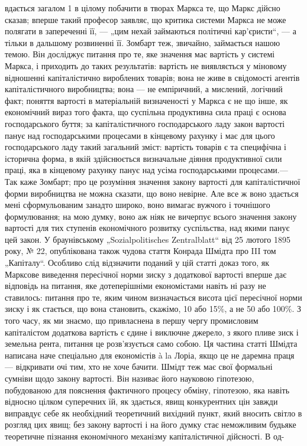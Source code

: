 \parcont{}  %
вдається загалом 1 в цілому побачити в творах Маркса те, що Маркс дійсно сказав; вперше такий професор заявляє, що критика системи Маркса не може полягати в запереченні її, — „цим нехай займаються політичні кар’єристи“, — а тільки в дальшому
розвиненні її. Зомбарт теж, звичайно, займається нашою темою. Він досліджує питання про те, яке значення має вартість у
системі Маркса, і приходить до таких результатів: вартість не виявляється у міновому відношенні капіталістично
вироблених товарів; вона не живе в свідомості агентів капіталістичного виробництва; вона — не емпіричний, а мислений,
логічний факт; поняття вартості в матеріальній визначеності у Маркса є не що інше, як економічний вираз того факта, що
суспільна продуктивна сила праці є основа господарського буття; за капіталістичного господарського ладу закон вартості панує
над господарськими процесами в кінцевому рахунку і має для цього господарського ладу такий загальний зміст: вартість товарів
є та специфічна і історична форма, в якій здійснюється визначальне діяння продуктивної сили праці, яка в кінцевому рахунку
панує над усіма господарськими процесами.— Так каже Зомбарт; про це розуміння значення закону вартості для капіталістичної
форми виробництва не можна сказати, що воно невірне. Але все ж воно здається мені сформульованим занадто широко, воно
вимагає вужчого і точнішого формулювання; на мою думку, воно аж ніяк не вичерпує всього значення закону вартості для тих
ступенів економічного розвитку суспільства, над якими панує цей закон. У браунівському „Sozialpolitisches Zentralblatt“ від
25 лютого 1895 року, № 22, опублікована також чудова стаття Конрада Шмідта про III том „Капіталу“. Особливо слід відзначити
поданий у цій статті доказ того, як Марксове виведення пересічної норми зиску з додаткової вартості вперше дає відповідь на
питання, яке дотеперішніми економістами навіть ні разу не ставилось:  питання про те, яким чином визначається висота цієї
пересічної норми зиску і як стається, що вона становить, скажімо, 10 або 15\%, а не 50 або 100\%. З того часу, як ми
знаємо, що привласнена в першу чергу промисловим капіталістом додаткова вартість є єдине і виключне джерело, з якого пливе
зиск і земельна рента, питання це розв’язується само собою. Ця частина статті Шмідта написана наче спеціально для
економістів à la Лоріа, якщо це не даремна праця — відкривати очі тим, хто не хоче бачити. Шмідт теж має свої формальні
сумніви щодо закону вартості. Він називає його науковою гіпотезою, побудованою для пояснення фактичного процесу обміну,
гіпотезою, яка навіть відносно цілком суперечних їй, як здається, явищ конкурентних цін завжди виправдує себе як необхідний
теоретичний вихідний пункт, який вносить світло в розгляд цих явищ; без закону вартості і на його думку стає неможливим
будьяке теоретичне пізнання економічного механізму капіталістичної дійсності. В од-
\parbreak{}  %
